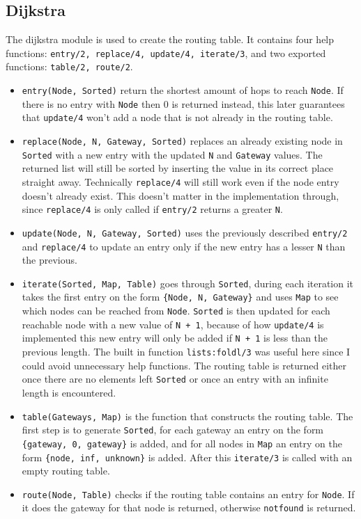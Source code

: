 \documentclass[a4paper, 11pt]{article}
\begin{document}
\subsection{Dijkstra}

The dijkstra module is used to create the routing table. It contains four help functions: \texttt{entry/2, replace/4, update/4, iterate/3}, and two exported functions: \texttt{table/2, route/2}.

\begin{itemize}

\item \texttt{entry(Node, Sorted)} return the shortest amount of hops to reach \texttt{Node}. If there is no entry with \texttt{Node} then 0 is returned instead, this later guarantees that \texttt{update/4} won't add a node that is not already in the routing table.

\item \texttt{replace(Node, N, Gateway, Sorted)} replaces an already existing node in \texttt{Sorted} with a new entry with the updated \texttt{N} and \texttt{Gateway} values. The returned list will still be sorted by inserting the value in its correct place straight away. Technically \texttt{replace/4} will still work even if the node entry doesn't already exist. This doesn't matter in the implementation through, since \texttt{replace/4} is only called if \texttt{entry/2} returns a greater \texttt{N}. 

\item \texttt{update(Node, N, Gateway, Sorted)} uses the previously described \texttt{entry/2} and \texttt{replace/4} to update an entry only if the new entry has a lesser \texttt{N} than the previous.

\item \texttt{iterate(Sorted, Map, Table)} goes through \texttt{Sorted}, during each iteration it takes the first entry on the form \texttt{\{Node, N, Gateway\}} and uses \texttt{Map} to see which nodes can be reached from \texttt{Node}. \texttt{Sorted} is then updated for each reachable node with a new value of \texttt{N + 1}, because of how \texttt{update/4} is implemented this new entry will only be added if \texttt{N + 1} is less than the previous length. The built in function \texttt{lists:foldl/3} was useful here since I could avoid unnecessary help functions. The routing table is returned either once there are no elements left \texttt{Sorted} or once an entry with an infinite length is encountered.

\item \texttt{table(Gateways, Map)} is the function that constructs the routing table. The first step is to generate \texttt{Sorted}, for each gateway an entry on the form \texttt{\{gateway, 0, gateway\}} is added, and for all nodes in \texttt{Map} an entry on the form \texttt{\{node, inf, unknown\}} is added. After this \texttt{iterate/3} is called with an empty routing table.

\item \texttt{route(Node, Table)} checks if the routing table contains an entry for \texttt{Node}. If it does the gateway for that node is returned, otherwise \texttt{notfound} is returned.

\end{itemize}
\end{document}
